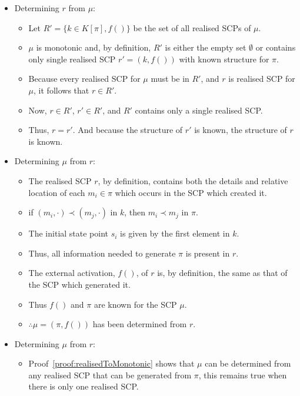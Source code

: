 \begin{bulletProof} \label{proof:monorealisedandback}
\begin{itemize}
\item Determining $r$ from $\mu$:
\begin{itemize}
\item Let $R'=\{k \in K[\pi],f()\}$ be the set of all realised SCPs of $\mu$.
\item $\mu$ is monotonic and, by definition, $R'$ is either the empty set $\emptyset$ or contains only single realised SCP $r'=(k,f())$ with known structure for $\pi$.
\item Because every realised SCP for $\mu$ must be in $R'$, and $r$ is realised SCP for $\mu$, it follows that $r \in R'$.
\item Now, $r \in R'$, $r' \in R'$, and $R'$ contains only a single realised SCP.
\item Thus, $r=r'$. And because the structure of $r'$ is known, the structure of $r$ is known.
\end{itemize}
\end{itemize}

\begin{itemize}
\item Determining $\mu$ from $r$:
\begin{itemize}
\item The realised SCP $r$, by definition, contains both the details and relative location of each $m_i \in \pi$ which occurs in the SCP which created it.
\item if $(m_i,\cdot) \prec (m_j,\cdot)$ in $k$, then $m_i \prec m_j$ in $\pi$.
\item The initial state point $s_i$ is given by the first element in $k$.
\item Thus, all information needed to generate $\pi$ is present in $r$.
\item The external activation, $f()$, of $r$ is, by definition, the same as that of the SCP which generated it.
\item Thus $f()$ and $\pi$ are known for the SCP $\mu$.
\item $\therefore \mu=(\pi,f())$ has been determined from $r$.
\end{itemize}
\item Determining $\mu$ from $r$:
\begin{itemize}
\item Proof~\ref{proof:realisedToMonotonic} shows that $\mu$ can be determined from any realised SCP that can be generated from $\pi$, this remains true when there is only one realised SCP.
\end{itemize}
\end{itemize}

\end{bulletProof}

